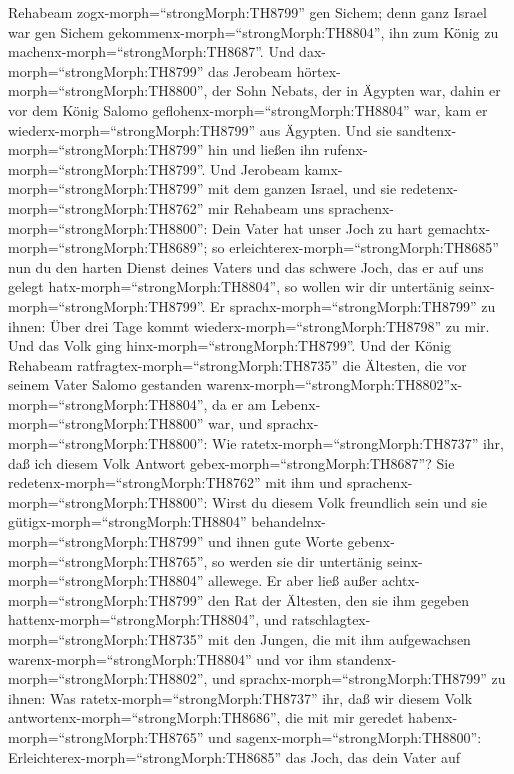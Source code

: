  Rehabeam zogx-morph=``strongMorph:TH8799'' gen Sichem; denn
ganz Israel war gen Sichem gekommenx-morph=``strongMorph:TH8804'', ihn
zum König zu machenx-morph=``strongMorph:TH8687''.  Und
dax-morph=``strongMorph:TH8799'' das Jerobeam
hörtex-morph=``strongMorph:TH8800'', der Sohn Nebats, der in Ägypten
war, dahin er vor dem König Salomo
geflohenx-morph=``strongMorph:TH8804'' war, kam er
wiederx-morph=``strongMorph:TH8799'' aus Ägypten.  Und sie
sandtenx-morph=``strongMorph:TH8799'' hin und ließen ihn
rufenx-morph=``strongMorph:TH8799''. Und Jerobeam
kamx-morph=``strongMorph:TH8799'' mit dem ganzen Israel, und sie
redetenx-morph=``strongMorph:TH8762'' mir Rehabeam uns
sprachenx-morph=``strongMorph:TH8800'':  Dein Vater hat
unser Joch zu hart gemachtx-morph=``strongMorph:TH8689''; so
erleichterex-morph=``strongMorph:TH8685'' nun du den harten Dienst
deines Vaters und das schwere Joch, das er auf uns gelegt
hatx-morph=``strongMorph:TH8804'', so wollen wir dir untertänig
seinx-morph=``strongMorph:TH8799''.  Er
sprachx-morph=``strongMorph:TH8799'' zu ihnen: Über drei Tage kommt
wiederx-morph=``strongMorph:TH8798'' zu mir. Und das Volk ging
hinx-morph=``strongMorph:TH8799''.  Und der König Rehabeam
ratfragtex-morph=``strongMorph:TH8735'' die Ältesten, die vor seinem
Vater Salomo gestanden
warenx-morph=``strongMorph:TH8802''x-morph=``strongMorph:TH8804'', da er
am Lebenx-morph=``strongMorph:TH8800'' war, und
sprachx-morph=``strongMorph:TH8800'': Wie
ratetx-morph=``strongMorph:TH8737'' ihr, daß ich diesem Volk Antwort
gebex-morph=``strongMorph:TH8687''?  Sie
redetenx-morph=``strongMorph:TH8762'' mit ihm und
sprachenx-morph=``strongMorph:TH8800'': Wirst du diesem Volk freundlich
sein und sie gütigx-morph=``strongMorph:TH8804''
behandelnx-morph=``strongMorph:TH8799'' und ihnen gute Worte
gebenx-morph=``strongMorph:TH8765'', so werden sie dir untertänig
seinx-morph=``strongMorph:TH8804'' allewege.  Er aber ließ
außer achtx-morph=``strongMorph:TH8799'' den Rat der Ältesten, den sie
ihm gegeben hattenx-morph=``strongMorph:TH8804'', und
ratschlagtex-morph=``strongMorph:TH8735'' mit den Jungen, die mit ihm
aufgewachsen warenx-morph=``strongMorph:TH8804'' und vor ihm
standenx-morph=``strongMorph:TH8802'',  und
sprachx-morph=``strongMorph:TH8799'' zu ihnen: Was
ratetx-morph=``strongMorph:TH8737'' ihr, daß wir diesem Volk
antwortenx-morph=``strongMorph:TH8686'', die mit mir geredet
habenx-morph=``strongMorph:TH8765'' und
sagenx-morph=``strongMorph:TH8800'':
Erleichterex-morph=``strongMorph:TH8685'' das Joch, das dein Vater auf
